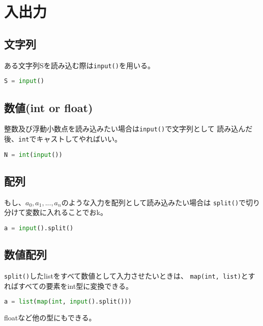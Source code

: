 
\section{入出力}

\subsection{文字列}

ある文字列Sを読み込む際は\texttt{input()}を用いる。

\begin{lstlisting}[language=Python]
  S = input()
\end{lstlisting}

\subsection{数値(int or float)}

整数及び浮動小数点を読み込みたい場合は\texttt{input()}で文字列として
読み込んだ後、\texttt{int}でキャストしてやればいい。

\begin{lstlisting}[language=Python]
  N = int(input())
\end{lstlisting}

\subsection{配列}
\label{sec:list}

もし、$a_0, a_1, ..., a_n$のような入力を配列として読み込みたい場合は
\texttt{split()}で切り分けて変数に入れることでおk。

\begin{lstlisting}[language=Python]
  a = input().split()
\end{lstlisting}

\newpage

\subsection{数値配列}
\texttt{split()}したlistをすべて数値として入力させたいときは、
\texttt{map(int, list)}とすればすべての要素をint型に変換できる。

\begin{lstlisting}[language=Python]
  a = list(map(int, input().split()))
\end{lstlisting}

floatなど他の型にもできる。

